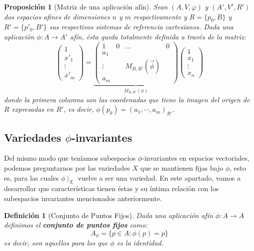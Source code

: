 \documentclass[10pt,a4paper,openright]{book}
\theoremstyle{break}
\newtheorem*{defi}{Definición}
\newtheorem*{prop}{Proposición}
\begin{document}
\begin{prop}[Matriz de una aplicación afín]
Sean $(A,V,\varphi)$ y $(A',V',R')$ dos espacios afines de dimensiones $n$ y $m$ respectivamente y $R = \{p_0 , B\}$ y $R' = \{p'_0, B'\}$ sus respectivos sistemas de referencia cartesianos. Dada una aplicación $\phi: A \to A'$ afín, ésta queda totalmente definida a través de la matriz:
$$ \begin{pmatrix}
1 \\ x'_1 \\ \vdots \\ x'_m
\end{pmatrix} = \underbrace{\left(\begin{array}{c|ccc}
1  & 0 & \ldots & 0 \\
\hline
a_1  &  & & \\
\vdots &  &M_{B, B'} (\vec{\phi}) & \\
a_m & & &
\end{array}
\right)}_{M_{R, R'} (\phi)} \begin{pmatrix}
1 \\ x_1 \\ \vdots \\ x_n
\end{pmatrix} $$
donde la primera columna son las coordenadas que tiene la imagen del origen de $R$ expresadas en $R'$, es decir, $\phi(p_0) = (a_1, \cdots, a_m)_{R'}$.
\end{prop}

\subsection{Variedades $\phi$-invariantes}
Del mismo modo que teníamos subespacios $\phi$-invariantes en espacios vectoriales, podemos preguntarnos por las variedades $X$ que se mantienen fijas bajo $\phi$, esto es, para las cuales $\phi\mid_X$ vuelve a ser una variedad. En este apartado, vamos a desarrollar que características tienen éstas y su íntima relación con los subespacios invariantes mencionados anteriormente.

\begin{defi}[Conjunto de Puntos Fijos]
Dada una aplicación afín $\phi: A\rightarrow A$ definimos el \textbf{conjunto de puntos fijos} como:
$$A_\phi = \{p\in A: \phi(p) = p\}$$
es decir, son aquellos para los que $\phi$ es la identidad.
\end{defi}
\end{document}
